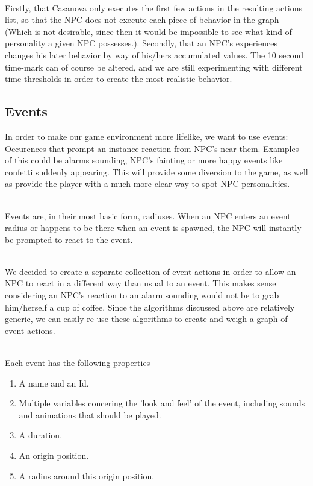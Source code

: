 \documentclass[11pt]{article} %
\begin{document}
~\\
Firstly, that Casanova only executes the first few actions in the resulting actions list, so that the NPC does not execute each piece of behavior in the graph (Which is not desirable, since then it would be impossible to see what kind of personality a given NPC possesses.). 
Secondly, that an NPC's experiences changes his later behavior by way of his/hers accumulated values. 
The 10 second time-mark can of course be altered, and we are still experimenting with different time thresholds in order to create the most realistic behavior.


\newpage
\subsection{Events}
In order to make our game environment more lifelike, we want to use events: Occurences that prompt an instance reaction from NPC's near them. Examples of this could be alarms sounding, NPC's fainting or more happy events like confetti suddenly appearing. This will provide some diversion to the game, as well as provide the player with a much more clear way to spot NPC personalities.

~\\
Events are, in their most basic form, radiuses. When an NPC enters an event radius or happens to be there when an event is spawned, the NPC will instantly be prompted to react to the event.

~\\
We decided to create a separate collection of event-actions in order to allow an NPC to react in a different way than usual to an event. This makes sense considering an NPC's reaction to an alarm sounding would not be to grab him/herself a cup of coffee.
Since the algorithms discussed above are relatively generic, we can easily re-use these algorithms to create and weigh a graph of event-actions. 

~\\
Each event has the following properties 

\begin{enumerate}
\item A name and an Id.
\item Multiple variables concering the 'look and feel' of the event, including sounds and animations that should be played.
\item A duration.
\item An origin position.
\item A radius around this origin position.
\end{enumerate}
\end{document}
